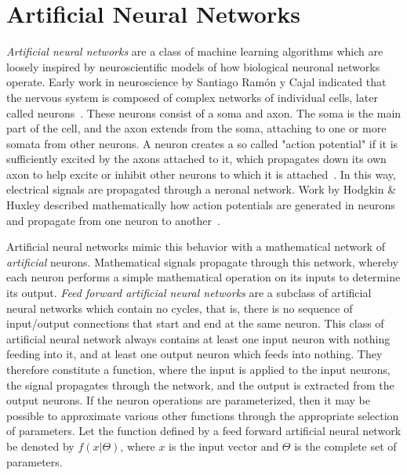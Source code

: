 \chapter{Artificial Neural Networks}
\label{chap:neuralnetworks}

\emph{Artificial neural networks} are a class of machine learning algorithms which are loosely inspired by neuroscientific models of how biological neuronal networks operate.
Early work in neuroscience by Santiago Ram{\'o}n y Cajal indicated that the nervous system is composed of complex networks of individual cells, later called neurons~\cite{cajal1955}.
These neurons consist of a soma and axon.
The soma is the main part of the cell, and the axon extends from the soma, attaching to one or more somata from other neurons.
A neuron creates a so called "action potential" if it is sufficiently excited by the axons attached to it, which propagates down its own axon to help excite or inhibit other neurons to which it is attached~\cite{mcculloch1943}.
In this way, electrical signals are propagated through a neronal network.
Work by Hodgkin \& Huxley described mathematically how action potentials are generated in neurons and propagate from one neuron to another~\cite{hodgkin1952}.

Artificial neural networks mimic this behavior with a mathematical network of \emph{artificial} neurons.
Mathematical signals propagate through this network, whereby each neuron performs a simple mathematical operation on its inputs to determine its output.
\emph{Feed forward artificial neural networks} are a subclass of artificial neural networks which contain no cycles, that is, there is no sequence of input/output connections that start and end at the same neuron.
This class of artificial neural network always contains at least one input neuron with nothing feeding into it, and at least one output neuron which feeds into nothing.
They therefore constitute a function, where the input is applied to the input neurons, the signal propagates through the network, and the output is extracted from the output neurons.
If the neuron operations are parameterized, then it may be possible to approximate various other functions through the appropriate selection of parameters.
Let the function defined by a feed forward artificial neural network be denoted by $f(x|\Theta)$, where $x$ is the input vector and $\Theta$ is the complete set of parameters.


